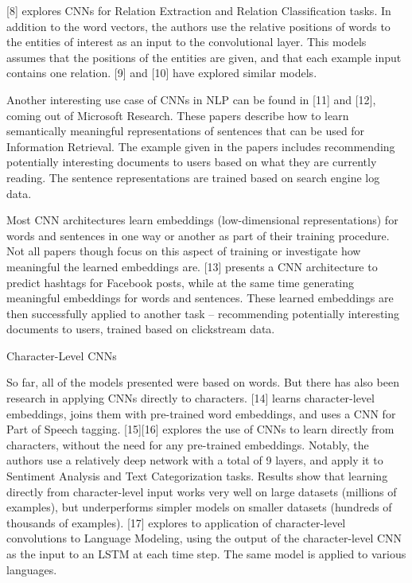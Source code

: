 \documentclass[UTF8,10pt,a4paper]{ctexbook}
\begin{document}
[8] explores CNNs for Relation Extraction and Relation Classification tasks. In addition to the word vectors, the authors use the relative positions of words to the entities of interest as an input to the convolutional layer. This models assumes that the positions of the entities are given, and that each example input contains one relation. [9] and [10] have explored similar models.

Another interesting use case of CNNs in NLP can be found in [11] and [12], coming out of Microsoft Research. These papers describe how to learn semantically meaningful representations of sentences that can be used for Information Retrieval. The example given in the papers includes recommending potentially interesting documents to users based on what they are currently reading. The sentence representations are trained based on search engine log data.

Most CNN architectures learn embeddings (low-dimensional representations) for words and sentences in one way or another as part of their training procedure. Not all papers though focus on this aspect of training or investigate how meaningful the learned embeddings are. [13] presents a CNN architecture to predict hashtags for Facebook posts, while at the same time generating meaningful embeddings for words and sentences. These learned embeddings are then successfully applied to another task – recommending potentially interesting documents to users, trained based on clickstream data.

Character-Level CNNs

So far, all of the models presented were based on words. But there has also been research in applying CNNs directly to characters. [14] learns character-level embeddings, joins them with pre-trained word embeddings, and uses a CNN for Part of Speech tagging. [15][16] explores the use of CNNs to learn directly from characters, without the need for any pre-trained embeddings. Notably, the authors use a relatively deep network with a total of 9 layers, and apply it to Sentiment Analysis and Text Categorization tasks. Results show that learning directly from character-level input works very well on large datasets (millions of examples), but underperforms simpler models on smaller datasets (hundreds of thousands of examples). [17] explores to application of character-level convolutions to Language Modeling, using the output of the character-level CNN as the input to an LSTM at each time step. The same model is applied to various languages.
\end{document}
